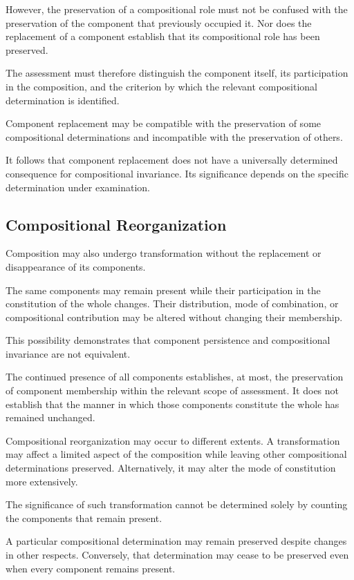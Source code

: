 However, the preservation of a compositional role must
not be confused with the preservation of the component
that previously occupied it. Nor does the replacement
of a component establish that its compositional role
has been preserved.

The assessment must therefore distinguish the component
itself, its participation in the composition, and the
criterion by which the relevant compositional determination
is identified.

Component replacement may be compatible with the preservation
of some compositional determinations and incompatible
with the preservation of others.

It follows that component replacement does not have
a universally determined consequence for compositional
invariance. Its significance depends on the specific
determination under examination.

\subsection{Compositional Reorganization}

Composition may also undergo transformation without
the replacement or disappearance of its components.

The same components may remain present while their
participation in the constitution of the whole changes.
Their distribution, mode of combination, or compositional
contribution may be altered without changing their
membership.

This possibility demonstrates that component persistence
and compositional invariance are not equivalent.

The continued presence of all components establishes,
at most, the preservation of component membership within
the relevant scope of assessment. It does not establish
that the manner in which those components constitute
the whole has remained unchanged.

Compositional reorganization may occur to different
extents. A transformation may affect a limited aspect
of the composition while leaving other compositional
determinations preserved. Alternatively, it may alter
the mode of constitution more extensively.

The significance of such transformation cannot be
determined solely by counting the components that remain
present.

A particular compositional determination may remain
preserved despite changes in other respects. Conversely,
that determination may cease to be preserved even when
every component remains present.

